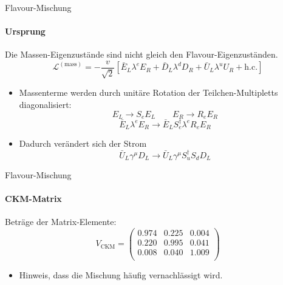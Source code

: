 \begin{frame}{Flavour-Mischung}
\framesubtitle{Ursprung}
Die Massen-Eigenzustände sind nicht gleich den Flavour-Eigenzuständen.
\[ \mathcal{L}^{(\text{mass})} = -\frac{v}{\sqrt{2}}\left[ \bar{E}_L\lambda^e E_R  + \bar{D}_L \lambda^dD_R + \bar{U}_L\lambda^u U_R + \text{h.c.}\right] \]
\begin{itemize}
	\item Massenterme werden durch unitäre Rotation der Teilchen-Multipletts diagonalisiert: \[ E_L \rightarrow S_eE_L \qquad E_R \rightarrow R_eE_R \]
	\[ \bar{E}_L\lambda^e E_R \rightarrow \bar{E}_LS_e^\dagger\lambda^eR_e E_R \]
	\item Dadurch verändert sich der Strom
	\[ \bar{U}_L\gamma^\mu D_L \rightarrow \bar{U}_L\gamma^\mu S_u^\dagger S_dD_L \]
\end{itemize}
\end{frame}
\begin{frame}{Flavour-Mischung}
\framesubtitle{CKM-Matrix}
Beträge der Matrix-Elemente: \[ V_\text{CKM} = \begin{pmatrix}
	0.974 & 0.225 & 0.004 \\
	0.220 & 0.995 & 0.041 \\
	0.008 & 0.040 & 1.009 \\
\end{pmatrix} \]
\begin{itemize}
	\item Hinweis, dass die Mischung häufig vernachlässigt wird.
\end{itemize}
\end{frame}